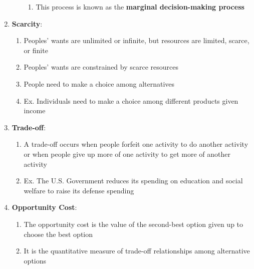 \documentclass[12pt]{article}
\begin{document}
\begin{enumerate}
\begin{enumerate}
\begin{enumerate}
              \item This process is known as the \textbf{marginal decision-making process}

            \end{enumerate}

        \end{enumerate}

      \item \textbf{Scarcity}:

        \begin{enumerate}

          \item Peoples' wants are unlimited or infinite, but resources are limited, scarce, or finite

          \item Peoples' wants are constrained by scarce resources

          \item People need to make a choice among alternatives

          \item Ex. Individuals need to make a choice among different products given income

        \end{enumerate}

      \item \textbf{Trade-off}:

        \begin{enumerate}

          \item A trade-off occurs when people forfeit one activity to do another activity or when people give up more of one activity to get more of another activity

          \item Ex. The U.S. Government reduces its spending on education and social welfare to raise its defense spending

        \end{enumerate}

      \item \textbf{Opportunity Cost}:

        \begin{enumerate}

          \item The opportunity cost is the value of the second-best option given up to choose the best option

          \item It is the quantitative measure of trade-off relationships among alternative options


\end{enumerate}
\end{enumerate}
\end{document}
